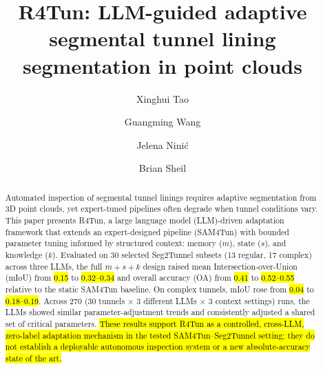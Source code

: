 \documentclass[a4paper,fleqn]{cas-dc}
\begin{document}
\let\WriteBookmarks\relax
\def\floatpagepagefraction{1}
\def\textpagefraction{.001}





\title[mode=title]{R4Tun: LLM-guided adaptive segmental tunnel lining segmentation in point clouds}

\author[1]{Xinghui Tao}

\author[1]{Guangming Wang}
\cormark[1]

\author[2]{Jelena Nini\'{c}}

\author[1]{Brian Sheil}






\begin{abstract}
Automated inspection of segmental tunnel linings requires adaptive segmentation from 3D point clouds, yet expert-tuned pipelines often degrade when tunnel conditions vary. This paper presents R4Tun, a large language model (LLM)-driven adaptation framework that extends an expert-designed pipeline (SAM4Tun) with bounded parameter tuning informed by structured context: memory ($m$), state ($s$), and knowledge ($k$). Evaluated on 30 selected Seg2Tunnel subsets (13 regular, 17 complex) across three LLMs, the full $m+s+k$ design raised mean Intersection-over-Union (mIoU) from \hl{0.15} to \hl{0.32--0.34} and overall accuracy (OA) from \hl{0.41} to \hl{0.52--0.55} relative to the static SAM4Tun baseline. On complex tunnels, mIoU rose from \hl{0.04} to \hl{0.18--0.19}. Across 270 (30 tunnels $\times$ 3 different LLMs $\times$ 3 context settings) runs, the LLMs showed similar parameter-adjustment trends and consistently adjusted a shared set of critical parameters. \hl{These results support R4Tun as a controlled, cross-LLM, zero-label adaptation mechanism in the tested SAM4Tun--Seg2Tunnel setting; they do not establish a deployable autonomous inspection system or a new absolute-accuracy state of the art.}
\end{abstract}
\end{document}
